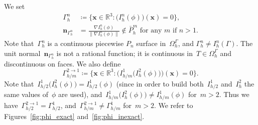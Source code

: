 \documentclass[12pt]{article}
\newcommand{\vect}[1]{\boldsymbol{\mathbf{#1}}}
\begin{document}
We set
\begin{align}\label{gammah}
	\Gamma_h^n &\coloneqq \{ \vect x \in \mathbb{R}^3 : \big(I_h^n(\phi)\big)(\vect x) = 0 \}, \\
	\vect n_{\Gamma_h^n} &= \frac{\nabla I_h^n(\phi)}{\|\nabla I_h^n(\phi)\|} \not\in \bar{P}_h^m\text{ for any $m$ if $n > 1$}. \label{gammah:n}
\end{align}  
	Note that~$\Gamma_h^n$ is a continuous piecewise $P_n$ surface in~$\Omega_h^\Gamma$, and $\Gamma_h^n \ne I_h^n(\Gamma)$. The unit normal~$\vect n_{\Gamma_h^n}$ is not a rational function; it is continuous in~$T \in \Omega_h^\Gamma$ and discontinuous on faces. We also define
\begin{equation}\label{gammah2}
	\Gamma_{h/m}^{2 \rightarrow 1} \coloneqq \{ \vect x \in \mathbb{R}^3 : \Big(I_{h/m}^1\big(I_h^2(\phi)\big)\Big)(\vect x) = 0 \}.
\end{equation}  
Note that~$I_{h/2}^1\big(I_{h}^2(\phi)\big) = I_{h/2}^1(\phi)$ (since in order to build both~$I_{h/2}^1$ and~$I_{h}^2$ the same values of~$\phi$ are used), and~$I_{h/m}^1\big(I_{h}^2(\phi)\big) \ne I_{h/m}^1(\phi)$ for~$m > 2$. Thus we have~$\Gamma_{h/2}^{2 \rightarrow 1} = \Gamma_{h/2}^1$, and~$\Gamma_{h/m}^{2 \rightarrow 1} \ne \Gamma_{h/m}^1$ for~$m > 2$. We refer to Figures~\ref{fig:phi_exact} and~\ref{fig:phi_inexact}. 
\end{document}
